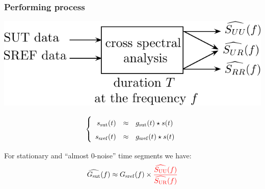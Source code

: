 \documentclass[handout,9pt]{beamer}
\def\sut{\mathrm{sut}}
\def\sref{\mathrm{sref}}
\begin{document}
\begin{frame}
\frametitle{Performing process}

\begin{center}
\includegraphics[scale=0.6]{processdetail.pdf}
\end{center}

\vspace{-0.5cm}

\begin{eqnarray*}
\left\{
\renewcommand\arraystretch{1.6}
\begin{array}{rcl}
s_{\sut}(t)&\approx&g_{\sut}(t)\star s(t) 
\\
s_{\sref}(t)&\approx&g_{\sref}(t)\star s(t)
\end{array}\right.
\end{eqnarray*}

For stationary and ``almost 0-noise'' time segments we have:
\begin{eqnarray*}
\widehat{G_{\sut}}(f)
\approx G_{\sref}(f) \times
\color{red}\frac{\widehat{{S}_{\mathrm{UU}}}(f)}
                        {\widehat{{S}_{\mathrm{UR}}}(f)}
\end{eqnarray*}


\end{frame}
\end{document}
